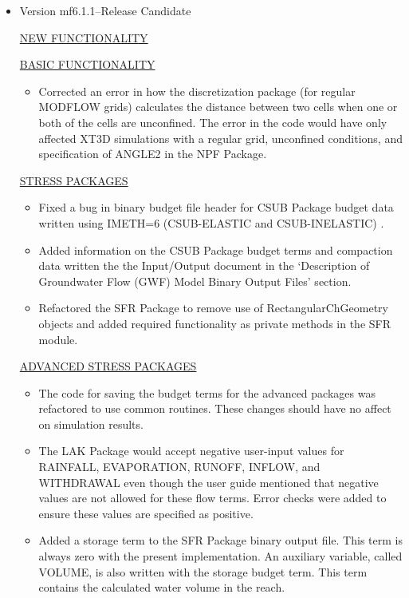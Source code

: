 \documentclass[11pt,twoside,twocolumn]{usgsreport}
\begin{document}
\begin{itemize}
\item Version mf6.1.1--Release Candidate

\underline{NEW FUNCTIONALITY}

\underline{BASIC FUNCTIONALITY}
\begin{itemize}
\item Corrected an error in how the discretization package (for regular MODFLOW grids) calculates the distance between two cells when one or both of the cells are unconfined.  The error in the code would have only affected XT3D simulations with a regular grid, unconfined conditions, and specification of ANGLE2 in the NPF Package.  
\end{itemize}

\underline{STRESS PACKAGES}
\begin{itemize}
	\item Fixed a bug in binary budget file header for CSUB Package budget data written using IMETH=6 (CSUB-ELASTIC and CSUB-INELASTIC) .
	\item Added information on the CSUB Package budget terms and compaction data written the the Input/Output document in the `Description of Groundwater Flow (GWF) Model Binary Output Files' section.
	\item Refactored the SFR Package to remove use of RectangularChGeometry objects and added required functionality as private methods in the SFR module.
\end{itemize}

\underline{ADVANCED STRESS PACKAGES}
\begin{itemize}
\item The code for saving the budget terms for the advanced packages was refactored to use common routines.  These changes should have no affect on simulation results.
\item The LAK Package would accept negative user-input values for  RAINFALL, EVAPORATION, RUNOFF, INFLOW, and WITHDRAWAL even though the user guide mentioned that negative values are not allowed for these flow terms.  Error checks were added to ensure these values are specified as positive.
\item Added a storage term to the SFR Package binary output file.  This term is always zero with the present implementation.  An auxiliary variable, called VOLUME, is also written with the storage budget term.  This term contains the calculated water volume in the reach.
\end{itemize}


\end{itemize}
\end{document}
